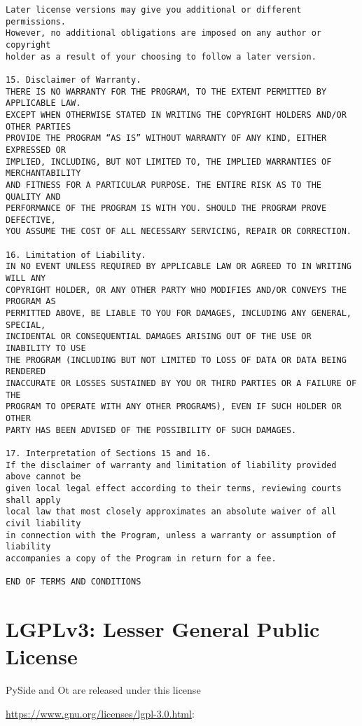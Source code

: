 \begin{verbatim}
Later license versions may give you additional or different permissions.
However, no additional obligations are imposed on any author or copyright
holder as a result of your choosing to follow a later version.

15. Disclaimer of Warranty.
THERE IS NO WARRANTY FOR THE PROGRAM, TO THE EXTENT PERMITTED BY APPLICABLE LAW.
EXCEPT WHEN OTHERWISE STATED IN WRITING THE COPYRIGHT HOLDERS AND/OR OTHER PARTIES
PROVIDE THE PROGRAM “AS IS” WITHOUT WARRANTY OF ANY KIND, EITHER EXPRESSED OR
IMPLIED, INCLUDING, BUT NOT LIMITED TO, THE IMPLIED WARRANTIES OF MERCHANTABILITY
AND FITNESS FOR A PARTICULAR PURPOSE. THE ENTIRE RISK AS TO THE QUALITY AND
PERFORMANCE OF THE PROGRAM IS WITH YOU. SHOULD THE PROGRAM PROVE DEFECTIVE,
YOU ASSUME THE COST OF ALL NECESSARY SERVICING, REPAIR OR CORRECTION.

16. Limitation of Liability.
IN NO EVENT UNLESS REQUIRED BY APPLICABLE LAW OR AGREED TO IN WRITING WILL ANY
COPYRIGHT HOLDER, OR ANY OTHER PARTY WHO MODIFIES AND/OR CONVEYS THE PROGRAM AS
PERMITTED ABOVE, BE LIABLE TO YOU FOR DAMAGES, INCLUDING ANY GENERAL, SPECIAL,
INCIDENTAL OR CONSEQUENTIAL DAMAGES ARISING OUT OF THE USE OR INABILITY TO USE
THE PROGRAM (INCLUDING BUT NOT LIMITED TO LOSS OF DATA OR DATA BEING RENDERED
INACCURATE OR LOSSES SUSTAINED BY YOU OR THIRD PARTIES OR A FAILURE OF THE
PROGRAM TO OPERATE WITH ANY OTHER PROGRAMS), EVEN IF SUCH HOLDER OR OTHER
PARTY HAS BEEN ADVISED OF THE POSSIBILITY OF SUCH DAMAGES.

17. Interpretation of Sections 15 and 16.
If the disclaimer of warranty and limitation of liability provided above cannot be
given local legal effect according to their terms, reviewing courts shall apply
local law that most closely approximates an absolute waiver of all civil liability
in connection with the Program, unless a warranty or assumption of liability
accompanies a copy of the Program in return for a fee.

END OF TERMS AND CONDITIONS

\end{verbatim}
\normalsize
\section{LGPLv3: Lesser General Public License}

PySide and Ot are released under this license

\url{https://www.gnu.org/licenses/lgpl-3.0.html}:
\scriptsize

